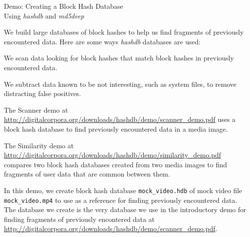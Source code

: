 \documentclass[12pt,twoside]{article}
\newcommand{\hdb}{\emph{hashdb}\xspace}
\newcommand{\mdd}{\emph{md5deep}\xspace}
\begin{document}
\begin{center}
\Large Demo: Creating a Block Hash Database \\
\large Using \hdb and \mdd
\end{center}

We build large databases of block hashes
to help us find fragments of previously encountered data.
Here are some ways \hdb databases are used:
\begin{compactitem}
\item We scan data looking for block hashes that match
block hashes in previously encountered data.
\item We subtract data known to be not interesting, such as system files,
to remove distracting false positives.
\end{compactitem}
The Scanner demo at
\url{http://digitalcorpora.org/downloads/hashdb/demo/scanner\_demo.pdf}
uses a block hash database to find previously encountered data
in a media image.

The Similarity demo at
\url{http://digitalcorpora.org/downloads/hashdb/demo/similarity\_demo.pdf}
compares two block hash databases created from two media images to find 
fragments of user data that are common between them.

In this demo, we create block hash database \texttt{mock\_video.hdb}
of mock video file \texttt{mock\_video.mp4}
to use as a reference for finding previously encountered data.
The database we create is the very database we use in the
introductory demo for finding fragments of previously encontered data at
\url{http://digitalcorpora.org/downloads/hashdb/demo/scanner\_demo.pdf}.
\end{document}
